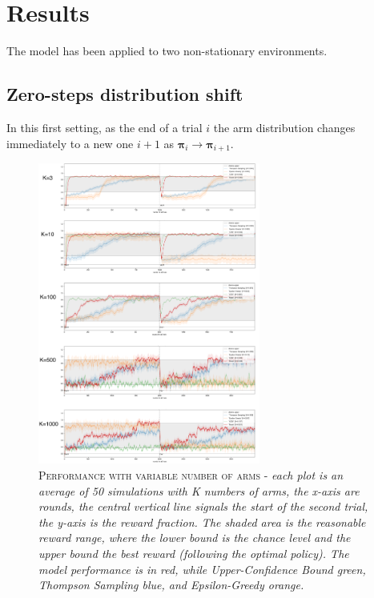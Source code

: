 
\section{Results}

The model has been applied to two non-stationary environments.

\subsection{Zero-steps distribution shift}
In this first setting, as the end of a trial $i$ the arm distribution changes immediately to a new one $i+1$ as $\mathbf{\pi}_{i} \to \mathbf{\pi}_{i+1}$.

\begin{figure}[h]
    \centering
    \includegraphics[width=0.65\textwidth]{figures/drawing.png}
    \caption{\textsc{Performance with variable number of arms} - \textit{each plot is an average of 50 simulations with K numbers of arms, the x-axis are rounds, the central vertical line signals the start of the second trial, the y-axis is the reward fraction.
            The shaded area is the reasonable reward
    range, where the lower bound is the chance level and the upper bound the best reward (following the optimal policy). The model performance is in red, while Upper-Confidence Bound green, Thompson Sampling blue, and Epsilon-Greedy orange. }}
\label{fig:zero_1}
\end{figure}


